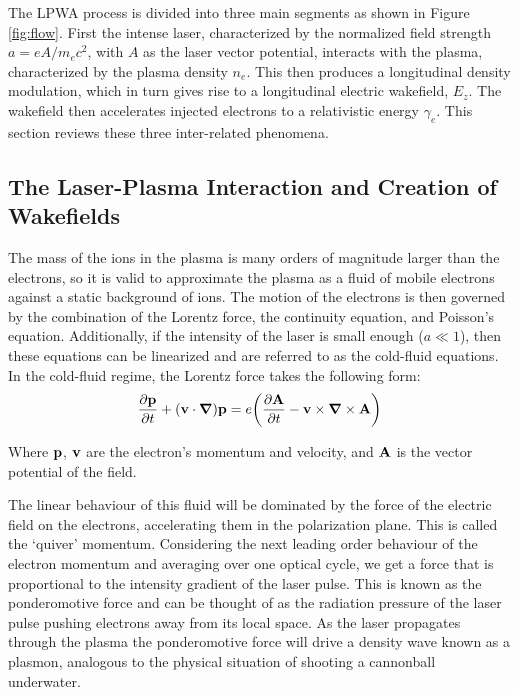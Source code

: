 \documentclass[12pt,letter]{article}
\begin{document}
The LPWA process is divided into three main segments as shown in Figure
\ref{fig:flow}. First the intense laser, characterized
by the normalized field strength $a = eA/m_e c^2$, with $A$ as the laser vector
potential, interacts with the
plasma, characterized by the plasma density $n_e$. This then produces a longitudinal
density modulation, which in turn gives rise to a longitudinal electric
wakefield, $E_z$. The wakefield then accelerates injected electrons to a relativistic energy
$\gamma_e$. This section reviews these three inter-related phenomena. 
\subsection{The Laser-Plasma Interaction and Creation of Wakefields}
\label{sec:wakefield}
The mass of the ions in the plasma is many orders of magnitude larger than the
electrons, so it is valid to approximate the plasma as a fluid of
mobile electrons against a static background of ions. The motion of the
electrons is then governed by the
combination of the Lorentz force, the continuity equation, and Poisson's
equation. Additionally, if the
intensity of the laser is small enough ($a\ll 1$), then these equations can be
linearized and are referred to as the cold-fluid
equations\cite{gorbunov1987excitation}.
In the cold-fluid regime, the Lorentz force takes the following form:
\begin{align}
    \label{eq:fullLPWA}
    \pdv{\vb{p}}{t} +(\vb{v} \cdot \grad)\vb{p} = e \qty(
    \pdv{\vb{A}}{t} - \vb{v}\times \grad \times \vb{A} )
\end{align}

Where $\vb{p}$, $\vb{v}$ are the electron's momentum and velocity, 
and $\vb{A}$ is the vector potential of the field.

The linear behaviour of this fluid will be dominated by the force of the
electric field on the electrons, accelerating them in the polarization
plane. This is called the `quiver' momentum. Considering the next leading order behaviour of the electron momentum and
averaging over one
optical cycle, we get a force that is proportional to the intensity gradient of the laser pulse. This is known as the
ponderomotive force\cite{RevModPhys.81.1229} and can be
thought of as the radiation pressure of the laser pulse pushing
electrons away from its local space. As the laser propagates
through the plasma the ponderomotive force will drive a density wave known as a
plasmon, analogous to the physical situation of shooting a
cannonball underwater.
\end{document}
